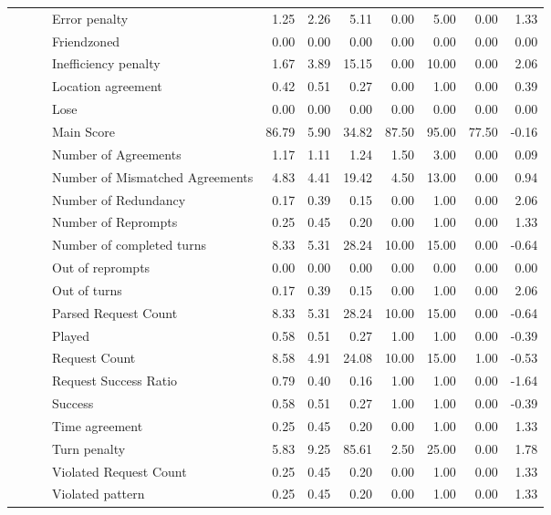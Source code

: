 \begin{tabular}{llllrrrrrrr}
 &  &  & Error penalty & 1.25 & 2.26 & 5.11 & 0.00 & 5.00 & 0.00 & 1.33 \\
 &  &  & Friendzoned & 0.00 & 0.00 & 0.00 & 0.00 & 0.00 & 0.00 & 0.00 \\
 &  &  & Inefficiency penalty & 1.67 & 3.89 & 15.15 & 0.00 & 10.00 & 0.00 & 2.06 \\
 &  &  & Location agreement & 0.42 & 0.51 & 0.27 & 0.00 & 1.00 & 0.00 & 0.39 \\
 &  &  & Lose & 0.00 & 0.00 & 0.00 & 0.00 & 0.00 & 0.00 & 0.00 \\
 &  &  & Main Score & 86.79 & 5.90 & 34.82 & 87.50 & 95.00 & 77.50 & -0.16 \\
 &  &  & Number of Agreements & 1.17 & 1.11 & 1.24 & 1.50 & 3.00 & 0.00 & 0.09 \\
 &  &  & Number of Mismatched Agreements & 4.83 & 4.41 & 19.42 & 4.50 & 13.00 & 0.00 & 0.94 \\
 &  &  & Number of Redundancy & 0.17 & 0.39 & 0.15 & 0.00 & 1.00 & 0.00 & 2.06 \\
 &  &  & Number of Reprompts & 0.25 & 0.45 & 0.20 & 0.00 & 1.00 & 0.00 & 1.33 \\
 &  &  & Number of completed turns & 8.33 & 5.31 & 28.24 & 10.00 & 15.00 & 0.00 & -0.64 \\
 &  &  & Out of reprompts & 0.00 & 0.00 & 0.00 & 0.00 & 0.00 & 0.00 & 0.00 \\
 &  &  & Out of turns & 0.17 & 0.39 & 0.15 & 0.00 & 1.00 & 0.00 & 2.06 \\
 &  &  & Parsed Request Count & 8.33 & 5.31 & 28.24 & 10.00 & 15.00 & 0.00 & -0.64 \\
 &  &  & Played & 0.58 & 0.51 & 0.27 & 1.00 & 1.00 & 0.00 & -0.39 \\
 &  &  & Request Count & 8.58 & 4.91 & 24.08 & 10.00 & 15.00 & 1.00 & -0.53 \\
 &  &  & Request Success Ratio & 0.79 & 0.40 & 0.16 & 1.00 & 1.00 & 0.00 & -1.64 \\
 &  &  & Success & 0.58 & 0.51 & 0.27 & 1.00 & 1.00 & 0.00 & -0.39 \\
 &  &  & Time agreement & 0.25 & 0.45 & 0.20 & 0.00 & 1.00 & 0.00 & 1.33 \\
 &  &  & Turn penalty & 5.83 & 9.25 & 85.61 & 2.50 & 25.00 & 0.00 & 1.78 \\
 &  &  & Violated Request Count & 0.25 & 0.45 & 0.20 & 0.00 & 1.00 & 0.00 & 1.33 \\
 &  &  & Violated pattern & 0.25 & 0.45 & 0.20 & 0.00 & 1.00 & 0.00 & 1.33 \\

\end{tabular}
